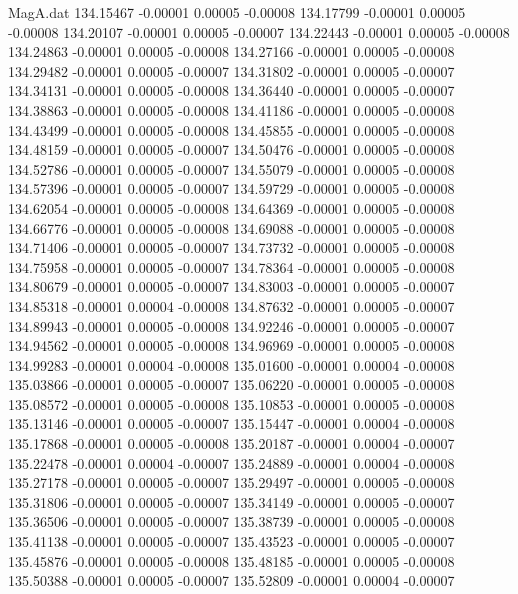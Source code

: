 \begin{filecontents}{MagA.dat}
 134.15467   -0.00001    0.00005   -0.00008
 134.17799   -0.00001    0.00005   -0.00008
 134.20107   -0.00001    0.00005   -0.00007
 134.22443   -0.00001    0.00005   -0.00008
 134.24863   -0.00001    0.00005   -0.00008
 134.27166   -0.00001    0.00005   -0.00008
 134.29482   -0.00001    0.00005   -0.00007
 134.31802   -0.00001    0.00005   -0.00007
 134.34131   -0.00001    0.00005   -0.00008
 134.36440   -0.00001    0.00005   -0.00007
 134.38863   -0.00001    0.00005   -0.00008
 134.41186   -0.00001    0.00005   -0.00008
 134.43499   -0.00001    0.00005   -0.00008
 134.45855   -0.00001    0.00005   -0.00008
 134.48159   -0.00001    0.00005   -0.00007
 134.50476   -0.00001    0.00005   -0.00008
 134.52786   -0.00001    0.00005   -0.00007
 134.55079   -0.00001    0.00005   -0.00008
 134.57396   -0.00001    0.00005   -0.00007
 134.59729   -0.00001    0.00005   -0.00008
 134.62054   -0.00001    0.00005   -0.00008
 134.64369   -0.00001    0.00005   -0.00008
 134.66776   -0.00001    0.00005   -0.00008
 134.69088   -0.00001    0.00005   -0.00008
 134.71406   -0.00001    0.00005   -0.00007
 134.73732   -0.00001    0.00005   -0.00008
 134.75958   -0.00001    0.00005   -0.00007
 134.78364   -0.00001    0.00005   -0.00008
 134.80679   -0.00001    0.00005   -0.00007
 134.83003   -0.00001    0.00005   -0.00007
 134.85318   -0.00001    0.00004   -0.00008
 134.87632   -0.00001    0.00005   -0.00007
 134.89943   -0.00001    0.00005   -0.00008
 134.92246   -0.00001    0.00005   -0.00007
 134.94562   -0.00001    0.00005   -0.00008
 134.96969   -0.00001    0.00005   -0.00008
 134.99283   -0.00001    0.00004   -0.00008
 135.01600   -0.00001    0.00004   -0.00008
 135.03866   -0.00001    0.00005   -0.00007
 135.06220   -0.00001    0.00005   -0.00008
 135.08572   -0.00001    0.00005   -0.00008
 135.10853   -0.00001    0.00005   -0.00008
 135.13146   -0.00001    0.00005   -0.00007
 135.15447   -0.00001    0.00004   -0.00008
 135.17868   -0.00001    0.00005   -0.00008
 135.20187   -0.00001    0.00004   -0.00007
 135.22478   -0.00001    0.00004   -0.00007
 135.24889   -0.00001    0.00004   -0.00008
 135.27178   -0.00001    0.00005   -0.00007
 135.29497   -0.00001    0.00005   -0.00008
 135.31806   -0.00001    0.00005   -0.00007
 135.34149   -0.00001    0.00005   -0.00007
 135.36506   -0.00001    0.00005   -0.00007
 135.38739   -0.00001    0.00005   -0.00008
 135.41138   -0.00001    0.00005   -0.00007
 135.43523   -0.00001    0.00005   -0.00007
 135.45876   -0.00001    0.00005   -0.00008
 135.48185   -0.00001    0.00005   -0.00008
 135.50388   -0.00001    0.00005   -0.00007
 135.52809   -0.00001    0.00004   -0.00007

\end{filecontents}
